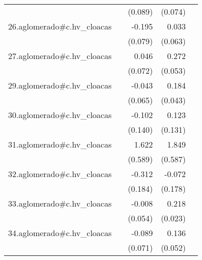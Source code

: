 {\begin{longtable}{l*{4}{D{.}{.}{-1}}}
            &                     &     (0.089)         &     (0.074)         &                     \\
\addlinespace
26.aglomerado#c.hv\_cloacas&                     &      -0.195\sym{*}  &       0.033         &                     \\
            &                     &     (0.079)         &     (0.063)         &                     \\
\addlinespace
27.aglomerado#c.hv\_cloacas&                     &       0.046         &       0.272\sym{***}&                     \\
            &                     &     (0.072)         &     (0.053)         &                     \\
\addlinespace
29.aglomerado#c.hv\_cloacas&                     &      -0.043         &       0.184\sym{***}&                     \\
            &                     &     (0.065)         &     (0.043)         &                     \\
\addlinespace
30.aglomerado#c.hv\_cloacas&                     &      -0.102         &       0.123         &                     \\
            &                     &     (0.140)         &     (0.131)         &                     \\
\addlinespace
31.aglomerado#c.hv\_cloacas&                     &       1.622\sym{**} &       1.849\sym{**} &                     \\
            &                     &     (0.589)         &     (0.587)         &                     \\
\addlinespace
32.aglomerado#c.hv\_cloacas&                     &      -0.312         &      -0.072         &                     \\
            &                     &     (0.184)         &     (0.178)         &                     \\
\addlinespace
33.aglomerado#c.hv\_cloacas&                     &      -0.008         &       0.218\sym{***}&                     \\
            &                     &     (0.054)         &     (0.023)         &                     \\
\addlinespace
34.aglomerado#c.hv\_cloacas&                     &      -0.089         &       0.136\sym{**} &                     \\
            &                     &     (0.071)         &     (0.052)         &                     \\

\end{longtable}}
